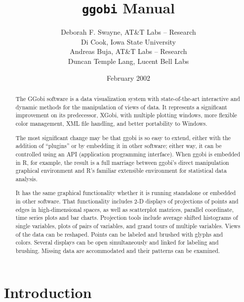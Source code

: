 \documentclass[11pt]{article}
\begin{document}
\tableofcontents
\title {{\tt ggobi} Manual}
\author{
Deborah F. Swayne, AT\&T Labs -- Research \\
Di Cook, Iowa State University \\
Andreas Buja, AT\&T Labs -- Research \\
Duncan Temple Lang, Lucent Bell Labs
}

\date{February 2002}

\maketitle

\begin{abstract}

The GGobi software is a data visualization system with state-of-the-art
interactive and dynamic methods for the manipulation of views of
data.  It represents a significant improvement on its predecessor, XGobi,
with multiple plotting windows, more flexible color management, XML file
handling, and better portability to Windows.

The most significant change may be that ggobi is so easy to extend, either
with the addition of ``plugins'' or by embedding it in other software;
either way, it can be controlled using an API (application programming
interface).  When ggobi is embedded in R, for example, the result is a
full marriage between ggobi's direct manipulation graphical environment
and R's familiar extensible environment for statistical data analysis.

It has the same graphical functionality whether it is running
standalone or embedded in other software.  That functionality includes
2-D displays of projections of points and edges in high-dimensional
spaces, as well as scatterplot matrices, parallel coordinate, time
series plots and bar charts.  Projection tools include average shifted
histograms of single variables, plots of pairs of variables, and grand
tours of multiple variables.  Views of the data can be reshaped.
Points can be labeled and brushed with glyphs and colors.  Several
displays can be open simultaneously and linked for labeling and
brushing.  Missing data are accommodated and their patterns can be
examined.
\end{abstract}

\newpage


\section{Introduction}
\end{document}
